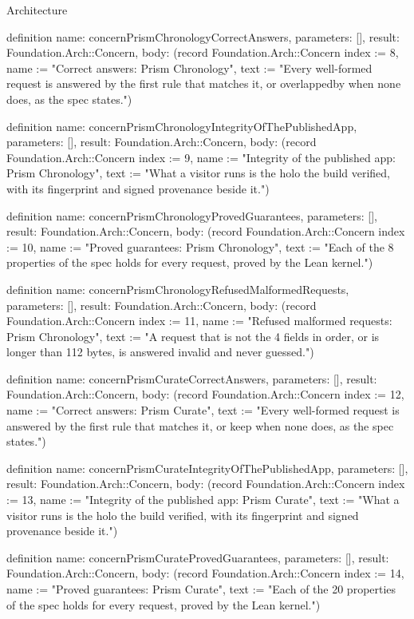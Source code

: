 \begin{lexlean}{Architecture}
\begin{semanticmodule}
definition{
  name: concernPrismChronologyCorrectAnswers,
  parameters: [],
  result: Foundation.Arch::Concern,
  body: (record Foundation.Arch::Concern {index := 8, name := "Correct answers: Prism Chronology", text := "Every well-formed request is answered by the first rule that matches it, or overlappedby when none does, as the spec states."})
}

definition{
  name: concernPrismChronologyIntegrityOfThePublishedApp,
  parameters: [],
  result: Foundation.Arch::Concern,
  body: (record Foundation.Arch::Concern {index := 9, name := "Integrity of the published app: Prism Chronology", text := "What a visitor runs is the holo the build verified, with its fingerprint and signed provenance beside it."})
}

definition{
  name: concernPrismChronologyProvedGuarantees,
  parameters: [],
  result: Foundation.Arch::Concern,
  body: (record Foundation.Arch::Concern {index := 10, name := "Proved guarantees: Prism Chronology", text := "Each of the 8 properties of the spec holds for every request, proved by the Lean kernel."})
}

definition{
  name: concernPrismChronologyRefusedMalformedRequests,
  parameters: [],
  result: Foundation.Arch::Concern,
  body: (record Foundation.Arch::Concern {index := 11, name := "Refused malformed requests: Prism Chronology", text := "A request that is not the 4 fields in order, or is longer than 112 bytes, is answered invalid and never guessed."})
}

definition{
  name: concernPrismCurateCorrectAnswers,
  parameters: [],
  result: Foundation.Arch::Concern,
  body: (record Foundation.Arch::Concern {index := 12, name := "Correct answers: Prism Curate", text := "Every well-formed request is answered by the first rule that matches it, or keep when none does, as the spec states."})
}

definition{
  name: concernPrismCurateIntegrityOfThePublishedApp,
  parameters: [],
  result: Foundation.Arch::Concern,
  body: (record Foundation.Arch::Concern {index := 13, name := "Integrity of the published app: Prism Curate", text := "What a visitor runs is the holo the build verified, with its fingerprint and signed provenance beside it."})
}

definition{
  name: concernPrismCurateProvedGuarantees,
  parameters: [],
  result: Foundation.Arch::Concern,
  body: (record Foundation.Arch::Concern {index := 14, name := "Proved guarantees: Prism Curate", text := "Each of the 20 properties of the spec holds for every request, proved by the Lean kernel."})
}


\end{semanticmodule}
\end{lexlean}
